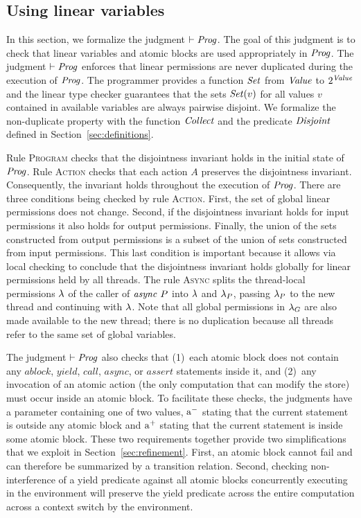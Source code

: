 \subsection{Using linear variables}
\label{sec:linearity}

In this section, we formalize the judgment $\vdash \mathit{Prog}$.
The goal of this judgment is to check that
linear variables and atomic blocks are used appropriately in $\mathit{Prog}$.
The judgment $\vdash \mathit{Prog}$ enforces that linear permissions are never duplicated during the 
execution of $\mathit{Prog}$.
The programmer provides a function $\mathit{Set}$ from $\mathit{Value}$ to $2^{\mathit{Value}}$
and the linear type checker guarantees that the sets $\mathit{Set}(v)$ for all values $v$ contained 
in available variables are always pairwise disjoint.
We formalize the non-duplicate property with the function $\mathit{Collect}$ and the predicate $\mathit{Disjoint}$
defined in Section~\ref{sec:definitions}.

Rule \textsc{Program} checks that the disjointness invariant holds in the initial state of $\mathit{Prog}$.
Rule \textsc{Action} checks that each action $A$ preserves the disjointness invariant.
Consequently, the invariant holds throughout the execution of $\mathit{Prog}$.
There are three conditions being checked by rule \textsc{Action}.
First, the set of global linear permissions does not change.
Second, if the disjointness invariant holds for input permissions it also holds for output permissions.
Finally, the union of the sets constructed from output permissions is a subset of the union of sets
constructed from input permissions.  
This last condition is important because it allows via local checking to conclude that the disjointness invariant holds globally
for linear permissions held by all threads.
The rule \textsc{Async} splits the thread-local permissions $\lambda$ of the caller of $\mathit{async}\ P$ into $\lambda$ 
and $\lambda_P$, passing $\lambda_P$ to the new thread and continuing with $\lambda$.
Note that all global permissions in $\lambda_G$ are also made available to the new thread;
there is no duplication because all threads refer to the same set of global variables.

The judgment $\vdash \mathit{Prog}$ also checks that 
(1)~each atomic block does not contain any $\mathit{ablock}$, $\mathit{yield}$, $\mathit{call}$, $\mathit{async}$, or $\mathit{assert}$ statements inside it, and
(2)~any invocation of an atomic action (the only computation that can modify the store) must occur inside an atomic block.
To facilitate these checks, the judgments have a parameter containing one of two values,
$\mathrm{a^-}$ stating that the current statement is outside any atomic block and
$\mathrm{a^+}$ stating that the current statement is inside some atomic block.
These two requirements together provide two simplifications that we exploit in Section~\ref{sec:refinement}.
First, an atomic block cannot fail and can therefore be summarized by a transition relation.
Second, checking non-interference of a yield predicate against all atomic blocks concurrently executing 
in the environment will preserve the yield predicate across the entire computation across a context switch by the environment.

